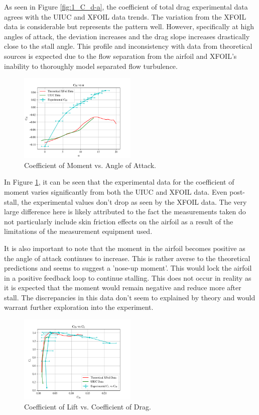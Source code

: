 \documentclass[11pt, letterpaper]{article}
\begin{document}
As seen in Figure \ref{fig:1_C_d-a}, the coefficient of total drag experimental data agrees with the UIUC and XFOIL data trends. The variation from the XFOIL data is considerable but represents the pattern well. However, specifically at high angles of attack, the deviation increases and the drag slope increases drastically close to the stall angle. This profile and inconsistency with data from theoretical sources is expected due to the flow separation from the airfoil and XFOIL's inability to thoroughly model separated flow turbulence.  

\begin{figure}[h]
        \centering        
        \includegraphics[width=0.5\textwidth]{Figures/C_m-a.png}
        \caption{Coefficient of Moment vs. Angle of Attack.}
        \label{fig:1_C_m-a}
\end{figure}

In Figure \ref{fig:1_C_m-a}, it can be seen that the experimental data for the coefficient of moment varies significantly from both the UIUC and XFOIL data. Even post-stall, the experimental values don't drop as seen by the XFOIL data. The very large difference here is likely attributed to the fact the measurements taken do not particularly include skin friction effects on the airfoil as a result of the limitations of the measurement equipment used. 

It is also important to note that the moment in the airfoil becomes positive as the angle of attack continues to increase. This is rather averse to the theoretical predictions and seems to suggest a 'nose-up moment'. This would lock the airfoil in a positive feedback loop to continue stalling. This does not occur in reality as it is expected that the moment would remain negative and reduce more after stall. The discrepancies in this data don't seem to explained by theory and would warrant further exploration into the experiment.

\begin{figure}[h]
        \centering        
        \includegraphics[width=0.5\textwidth]{Figures/C_l-C_d.png}
        \caption{Coefficient of Lift vs. Coefficient of Drag.}
        \label{fig:1_C_l-C_d}
\end{figure}
\end{document}
